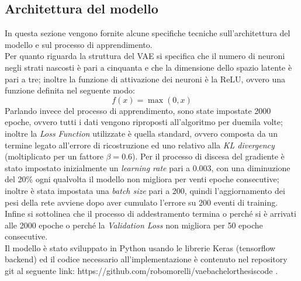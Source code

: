 \subsection{Architettura del modello}
\label{architettura del modello}
In questa sezione vengono fornite alcune specifiche tecniche sull'architettura del modello e sul processo di apprendimento.\\
Per quanto riguarda la struttura del VAE si specifica che il numero di neuroni negli strati nascosti è pari a cinquanta e che la dimensione dello spazio latente è pari a tre; inoltre la funzione di attivazione dei neuroni è la ReLU, ovvero una funzione definita nel seguente modo:
\begin{equation}
	f(x) = \max(0,x)
\end{equation} 
Parlando invece del processo di apprendimento, sono state impostate 2000 epoche, ovvero tutti i dati vengono riproposti all'algoritmo per duemila volte; inoltre la \textit{Loss Function} utilizzate è quella standard, ovvero composta da un termine legato all'errore di ricostruzione ed uno relativo alla \textit{KL divergency} (moltiplicato per un fattore $\beta=0.6$). Per il processo di discesa del gradiente è stato impostato inizialmente un \textit{learning rate} pari a 0.003, con una diminuzione del 20\% ogni qualvolta il modello non migliora per venti epoche consecutive; inoltre è stata impostata una \textit{batch size} pari a 200, quindi l'aggiornamento dei pesi della rete avviene dopo aver cumulato l'errore su 200 eventi di training. Infine si sottolinea che il processo di addestramento termina o perché si è arrivati alle 2000 epoche o perché la \textit{Validation Loss} non migliora per 50 epoche consecutive.\\
Il modello è stato sviluppato in Python usando le librerie Keras (tensorflow backend) ed il codice necessario all'implementazione è contenuto nel repository git al seguente link: https://github.com/robomorelli/vae\textunderscore bachelor\textunderscore thesis\textunderscore code \cite{Codice}.

